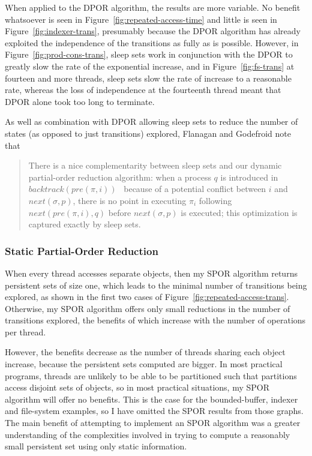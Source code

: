 \documentclass[12pt,a4paper,twoside,openright]{report}
\begin{document}
When applied to the DPOR algorithm, the results
are more variable. No benefit whatsoever is seen
in Figure~\ref{fig:repeated-access-time} and little
is seen in Figure~\ref{fig:indexer-trans},
presumably because the DPOR algorithm has already
exploited the independence of the transitions
as fully as is possible. However, in
Figure~\ref{fig:prod-cons-trans}, sleep sets
work in conjunction with the DPOR to greatly
slow the rate of the exponential increase,
and in Figure~\ref{fig:fs-trans} at fourteen and
more threads, sleep
sets slow the rate of increase to a reasonable
rate, whereas the loss of independence at the
fourteenth thread meant that DPOR alone took too long
to terminate.

As well as combination with DPOR allowing
sleep sets to reduce the number of states
(as opposed to just transitions) explored,
Flanagan and Godefroid note that
\begin{quote}
	There is a nice complementarity between sleep sets and our
	dynamic partial-order reduction algorithm: when a process
	$q$ is introduced in $\textit{backtrack}(\textit{pre}(\pi, i))$
	\textellipsis \ because
	of a potential conflict between $i$ and
	$\textit{next}(\sigma, p)$, there
	is no point in executing $\pi_i$ following
	$\textit{next}(\textit{pre}(\pi, i), q)$ before
	$\textit{next}(\sigma, p)$ is executed;
	this optimization is captured exactly
	by sleep sets. \cite{flan05}
\end{quote}

\subsubsection{Static Partial-Order Reduction}
When every thread accesses separate objects,
then my SPOR algorithm returns persistent sets
of size one, which leads to the minimal number
of transitions being explored, as shown in the
first two cases of
Figure~\ref{fig:repeated-access-trans}.
Otherwise, my SPOR algorithm offers only
small reductions in the number of transitions
explored, the benefits of which increase with
the number of operations per thread.

However, the benefits decrease as
the number of threads sharing each object
increase, because the persistent sets
computed are bigger. In most practical
programs, threads are unlikely to be
able to be partitioned such that
partitions access disjoint sets of objects,
so in most practical situations, my SPOR
algorithm will offer no benefits. This is
the case for the bounded-buffer, indexer
and file-system examples, so I have omitted
the SPOR results from those graphs.
The main benefit of attempting to implement
an SPOR algorithm was a greater understanding
of the complexities involved in trying to
compute a reasonably small persistent set
using only static information.
\end{document}

